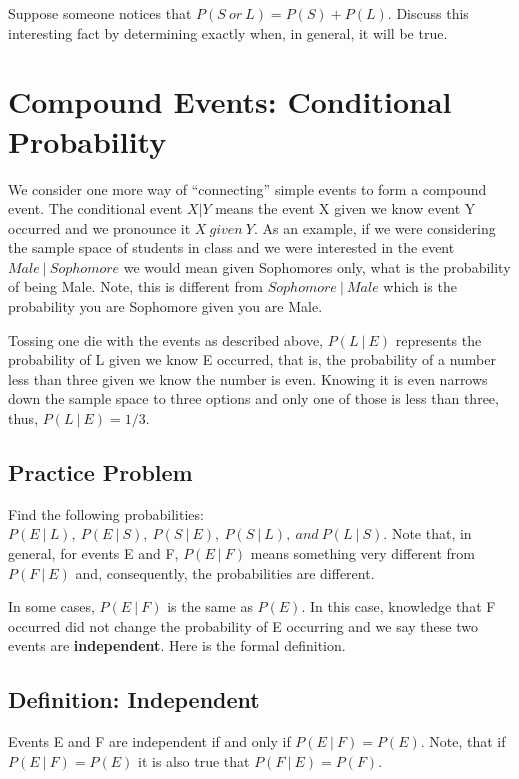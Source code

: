 \documentclass[]{book}
\theoremstyle{definition}
\theoremstyle{definition}
\theoremstyle{definition}
\theoremstyle{remark}
\begin{document}
Suppose someone notices that \(P(S \ or \ L) = P(S) + P(L)\). Discuss
this interesting fact by determining exactly when, in general, it will
be true.

\section{Compound Events: Conditional
Probability}\label{compound_events_conditional_probability}

We consider one more way of ``connecting'' simple events to form a
compound event. The conditional event \(X|Y\) means the event X given we
know event Y occurred and we pronounce it \(X \ given \ Y\). As an
example, if we were considering the sample space of students in class
and we were interested in the event \(Male \ | \ Sophomore\) we would
mean given Sophomores only, what is the probability of being Male. Note,
this is different from \(Sophomore \ | \ Male\) which is the probability
you are Sophomore given you are Male.

Tossing one die with the events as described above, \(P(L \ | \ E)\)
represents the probability of L given we know E occurred, that is, the
probability of a number less than three given we know the number is
even. Knowing it is even narrows down the sample space to three options
and only one of those is less than three, thus, \(P(L \ | \ E) = 1/3\).

\subsection{Practice Problem}\label{practice-problem-2}

Find the following probabilities:
\(P(E \ | \ L), \ P(E \ | \ S), \ P(S \ | \ E), \ P(S \ | \ L), \ and \ P(L \ | \ S)\).
Note that, in general, for events E and F, \(P(E \ | \ F)\) means
something very different from \(P(F \ | \ E)\) and, consequently, the
probabilities are different.

In some cases, \(P(E \ | \ F)\) is the same as \(P(E)\). In this case,
knowledge that F occurred did not change the probability of E occurring
and we say these two events are \textbf{independent}. Here is the formal
definition.

\subsection{Definition: Independent}\label{definition-independent}

Events E and F are independent if and only if \(P(E \ | \ F) = P(E)\).
Note, that if \(P(E \ | \ F) = P(E)\) it is also true that
\(P(F \ | \ E) = P(F)\).
\end{document}
